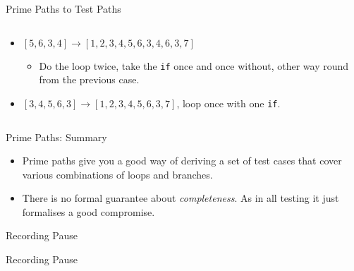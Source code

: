 \documentclass[handout]{beamer}
\newcommand{\recordingpause}{
\begin{frame}{Recording Pause}
  \begin{center}
    Recording Pause
  \end{center}
\end{frame}
}
\begin{document}
\begin{frame}{Prime Paths to Test Paths}
\begin{columns}
\begin{column}{0.7\textwidth}
\begin{itemize}
\begin{itemize}
    \end{itemize}
  \item $[5,6,3,4] \rightarrow   [1,2,3,4,5,6,3,4,6,3,7]$
    \begin{itemize}
    \item Do the loop twice, take the {\tt if} once and once without,
      other way round from the previous case.
    \end{itemize}
  \item $[3,4,5,6,3] \rightarrow [1,2,3,4,5,6,3,7]$, loop once with
    one {\tt if}.
  \end{itemize}
\end{column}
\end{columns}
\end{frame}

\begin{frame}{Prime Paths: Summary}
  \begin{itemize}
  \item Prime paths give you a good way of deriving a set of test
    cases that cover various combinations of loops and branches.
  \item There is no formal guarantee about {\it completeness}. As in all
    testing it just formalises a good compromise. 
  \end{itemize}

\end{frame}

\recordingpause

% 
%
\end{document}
